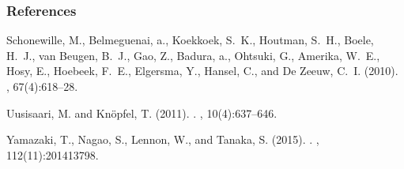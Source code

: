 \documentclass[10pt, compress]{beamer}
\begin{document}
\begin{frame}[fragile]
  \fontsize{5}{8}
  \selectfont
  \frametitle{References}
  \begin{thebibliography}{}

  Schonewille, M., Belmeguenai, a., Koekkoek, S.~K., Houtman, S.~H., Boele,
    H.~J., van Beugen, B.~J., Gao, Z., Badura, a., Ohtsuki, G., Amerika, W.~E.,
    Hosy, E., Hoebeek, F.~E., Elgersma, Y., Hansel, C., and {De Zeeuw}, C.~I.
    (2010).
  , 67(4):618--28.

  Uusisaari, M. and Kn\"{o}pfel, T. (2011).
  .
  , 10(4):637--646.

  Yamazaki, T., Nagao, S., Lennon, W., and Tanaka, S. (2015).
  .
  , 112(11):201413798.

  \end{thebibliography}
\end{frame}
\end{document}
